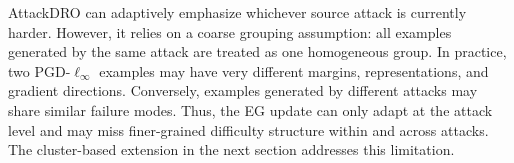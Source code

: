 AttackDRO can adaptively emphasize whichever source attack is currently harder.
However, it relies on a coarse grouping assumption: all examples generated by the same
attack are treated as one homogeneous group. In practice, two PGD-\(\ell_\infty\)
examples may have very different margins, representations, and gradient directions.
Conversely, examples generated by different attacks may share similar failure modes.
Thus, the EG update can only adapt at the attack level and may miss finer-grained
difficulty structure within and across attacks. The cluster-based extension in the next
section addresses this limitation.

